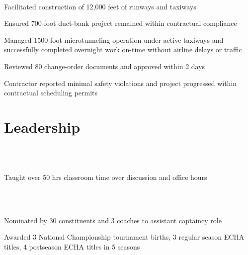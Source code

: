 \documentclass[letterpaper]{deedy-resume-openfont}
\begin{document}
\begin{minipage}[t]{0.67\textwidth}
\vspace{-0.1cm}
 \\
   \begin{tightemize}
        \item Facilitated construction of 12,000 feet of runways and taxiways 
        \item Ensured 700-foot duct-bank project remained within contractual compliance 
        \item Managed 1500-foot microtunneling operation under active taxiways and successfully completed overnight work on-time without airline delays or traffic 
        \item Reviewed 80 change-order documents and approved within 2 days
        \item Contractor reported minimal safety violations and project progressed within contractual scheduling permits
        \end{tightemize}
\sectionsep

\vspace{-0.5cm}
\section{Leadership}

\vspace{-0.1cm}
\\
  \\
   \begin{tightemize}
        \item Taught over 50 hrs classroom time over discussion and office hours
        \end{tightemize}
\sectionsep

\vspace{-0.1cm}
\\
\\
   \begin{tightemize}
        \item Nominated by 30 constituents and 3 coaches to assistant captaincy role
        \item Awarded 3 National Championship tournament births, 3 regular season ECHA titles, 4 postseason ECHA titles in 5 seasons
        \end{tightemize}
\sectionsep


\end{minipage}
\end{document}
